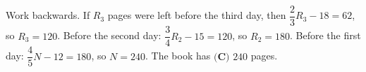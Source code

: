 Work backwards. If $R_3$ pages were left before the third day, then $\dfrac23R_3-18=62$, so $R_3=120$. Before the second day: $\dfrac34R_2-15=120$, so $R_2=180$. Before the first day: $\dfrac45N-12=180$, so $N=240$. The book has $\boxed{\textbf{(C) }240}$ pages.
